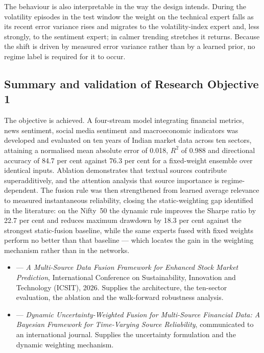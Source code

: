 The behaviour is also interpretable in the way the design intends. During the volatility
episodes in the test window the weight on the technical expert falls as its recent error
variance rises and migrates to the volatility-index expert and, less strongly, to the
sentiment expert; in calmer trending stretches it returns. Because the shift is driven by
measured error variance rather than by a learned prior, no regime label is required for it
to occur.

\subsection{Summary and validation of Research Objective 1}

The objective is achieved. A four-stream model integrating financial metrics, news
sentiment, social media sentiment and macroeconomic indicators was developed and
evaluated on ten years of Indian market data across ten sectors, attaining a normalised
mean absolute error of 0.018, $R^2$ of 0.988 and directional accuracy of 84.7 per cent
against 76.3 per cent for a fixed-weight ensemble over identical inputs. Ablation
demonstrates that textual sources contribute superadditively, and the attention analysis
that source importance is regime-dependent. The fusion rule was then strengthened from
learned average relevance to measured instantaneous reliability, closing the
static-weighting gap identified in the literature: on the Nifty~50 the dynamic rule
improves the Sharpe ratio by 22.7 per cent and reduces maximum drawdown by 18.3 per cent
against the strongest static-fusion baseline, while the same experts fused with fixed
weights perform no better than that baseline --- which locates the gain in the weighting
mechanism rather than in the networks.

\begin{itemize}
\item {} --- \emph{A Multi-Source Data Fusion Framework for Enhanced Stock
Market Prediction}, International Conference on Sustainability, Innovation and Technology
(ICSIT), 2026. Supplies the architecture, the ten-sector evaluation, the ablation and the
walk-forward robustness analysis.
\item {} --- \emph{Dynamic Uncertainty-Weighted Fusion for Multi-Source
Financial Data: A Bayesian Framework for Time-Varying Source Reliability}, communicated to
an international journal. Supplies the uncertainty formulation and the dynamic weighting
mechanism.
\end{itemize}

